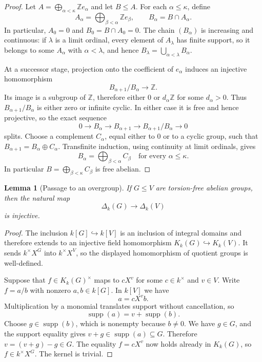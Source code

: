 \documentclass[11pt,a4paper]{article}
\numberwithin{equation}{section}
\theoremstyle{plain}
\newtheorem{lemma}[theorem]{Lemma}
\theoremstyle{definition}
\theoremstyle{remark}
\newcommand{\Z}{\mathbb Z}
\newcommand{\Kk}[1]{K_k(#1)}
\newcommand{\Dk}[1]{\Delta_k(#1)}
\newcommand{\mon}[1]{X^{#1}}
\begin{document}
\begin{proof}
Let $A=\bigoplus_{\alpha<\kappa}\Z e_\alpha$ and let $B\leq A$.  For each
$\alpha\leq\kappa$, define
\[
  A_\alpha=\bigoplus_{\beta<\alpha}\Z e_\beta,
  \qquad B_\alpha=B\cap A_\alpha.
\]
In particular, $A_0=0$ and $B_0=B\cap A_0=0$.
The chain $(B_\alpha)$ is increasing and continuous: if $\lambda$ is a
limit ordinal, every element of $A_\lambda$ has finite support, so it
belongs to some $A_\alpha$ with $\alpha<\lambda$, and hence
$B_\lambda=\bigcup_{\alpha<\lambda}B_\alpha$.

At a successor stage, projection onto the coefficient of $e_\alpha$
induces an injective homomorphism
\[
  B_{\alpha+1}/B_\alpha\longrightarrow\Z.
\]
Its image is a subgroup of $\Z$, therefore either $0$ or $d_\alpha\Z$ for
some $d_\alpha>0$.  Thus $B_{\alpha+1}/B_\alpha$ is either zero or infinite
cyclic.  In either case it is free and hence projective, so the exact
sequence
\[
  0\longrightarrow B_\alpha\longrightarrow B_{\alpha+1}
  \longrightarrow B_{\alpha+1}/B_\alpha\longrightarrow0
\]
splits.  Choose a complement $C_\alpha$, equal either to $0$ or to a cyclic
group, such that $B_{\alpha+1}=B_\alpha\oplus C_\alpha$.  Transfinite
induction, using continuity at limit ordinals, gives
\[
  B_\alpha=\bigoplus_{\beta<\alpha}C_\beta
  \quad\text{for every }\alpha\leq\kappa.
\]
In particular $B=\bigoplus_{\beta<\kappa}C_\beta$ is free abelian.
\end{proof}

\begin{lemma}[Passage to an overgroup]\label{lem:defect-injective}
If $G\leq V$ are torsion-free abelian groups, then the natural map
\[
  \Dk G\longrightarrow\Dk V
\]
is injective.
\end{lemma}

\begin{proof}
The inclusion $k[G]\hookrightarrow k[V]$ is an inclusion of integral
domains and therefore extends to an injective field homomorphism
$\Kk G\hookrightarrow\Kk V$.  It sends $k^\times X^G$ into
$k^\times X^V$, so the displayed homomorphism of quotient groups is
well-defined.

Suppose that $f\in\Kk G^\times$ maps to $c\mon v$ for some
$c\in k^\times$ and $v\in V$.  Write $f=a/b$ with nonzero
$a,b\in k[G]$.  In $k[V]$ we have
\[
  a=c\mon v b.
\]
Multiplication by a monomial translates support without cancellation, so
\[
  \operatorname{supp}(a)=v+\operatorname{supp}(b).
\]
Choose $g\in\operatorname{supp}(b)$, which is nonempty because $b\neq0$.
We have $g\in G$, and the support equality gives $v+g\in
\operatorname{supp}(a)\subseteq G$.  Therefore
$v=(v+g)-g\in G$.  The equality $f=c\mon v$ now holds already in
$\Kk G$, so $f\in k^\times X^G$.  The kernel is trivial.
\end{proof}
\end{document}
